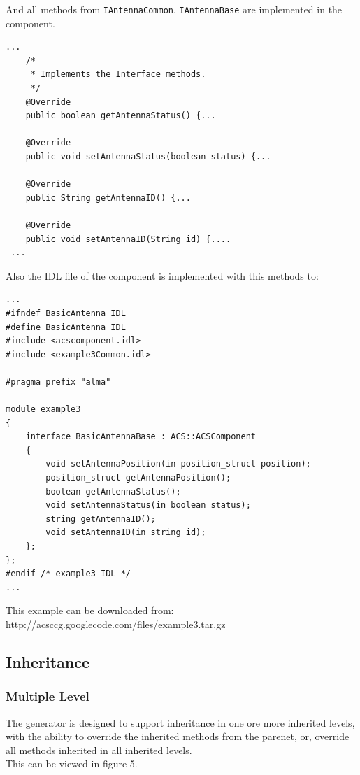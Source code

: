 And all methods from \verb+IAntennaCommon+, \verb+IAntennaBase+  are implemented
in the component.
\begin{center}
\begin{verbatim}
...
    /*
     * Implements the Interface methods.
     */
    @Override
    public boolean getAntennaStatus() {...

    @Override
    public void setAntennaStatus(boolean status) {...

    @Override
    public String getAntennaID() {...

    @Override
    public void setAntennaID(String id) {....
 ...
\end{verbatim}
\end{center}

Also the IDL file of the component is implemented with this methods to:
\begin{center}
\begin{verbatim}
...
#ifndef BasicAntenna_IDL
#define BasicAntenna_IDL
#include <acscomponent.idl>
#include <example3Common.idl>

#pragma prefix "alma"

module example3
{
    interface BasicAntennaBase : ACS::ACSComponent
    {
        void setAntennaPosition(in position_struct position);
        position_struct getAntennaPosition();
        boolean getAntennaStatus();
        void setAntennaStatus(in boolean status);
        string getAntennaID();
        void setAntennaID(in string id);
    };
};
#endif /* example3_IDL */
...
\end{verbatim}
\end{center}

This example can be downloaded from:
http://acsccg.googlecode.com/files/example3.tar.gz

\subsection{Inheritance}

\subsubsection{Multiple Level}
The generator is designed to support inheritance in one ore more inherited
levels, with the ability to override the inherited methods from the parenet, or,
override all methods inherited in all inherited levels.\\
This can be viewed in figure 5.

